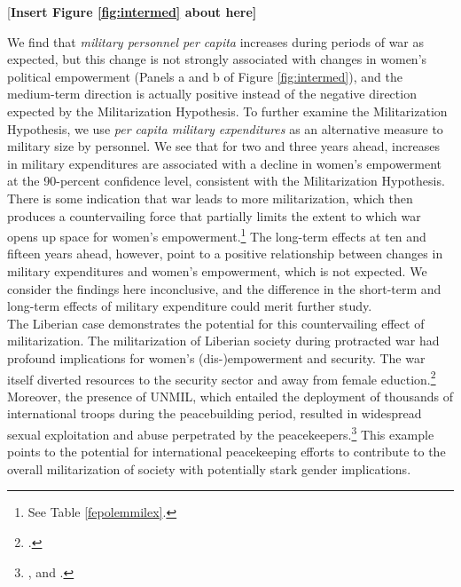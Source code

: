 \documentclass [12pt] {article}
\begin{document}
\begin{center}
[\bf Insert Figure \ref{fig:intermed} about here]
\end{center}
\vspace*{.2in}


We find that {\it military personnel per capita} increases during periods of war as expected, but this change is not strongly associated with changes in women's political empowerment (Panels a and b of Figure \ref{fig:intermed}), and the medium-term direction is actually positive instead of the negative direction expected by the Militarization Hypothesis. To further examine the Militarization Hypothesis, we use {\it per capita military expenditures} as an alternative measure to military size by personnel. We see that for two and three years ahead, increases in military expenditures are associated with a decline in women's empowerment at the 90-percent confidence level, consistent with the Militarization Hypothesis. There is some indication that war leads to more militarization, which then produces a countervailing force that partially limits the extent to which war opens up space for women's empowerment.\footnote{See %
Table \ref{fepolemmilex}.}  The long-term effects at ten and fifteen years ahead, however, point to a positive relationship between changes in military expenditures and women's empowerment, which is not expected. We consider the findings here inconclusive, and the difference in the short-term and long-term effects of military expenditure could merit further study.\\

The Liberian case demonstrates the potential for this countervailing effect of militarization. The militarization of Liberian society during protracted war had profound implications for women's (dis-)empowerment and security. The war itself diverted resources to the security sector and away from female eduction.\footnote{.}  Moreover, the presence of UNMIL, which entailed the deployment of thousands of international troops during the peacebuilding period, resulted in widespread sexual exploitation and abuse perpetrated by the peacekeepers.\footnote{,  and .} This example points to the potential for international peacekeeping efforts to contribute to the overall militarization of society with potentially stark gender implications.\\
\end{document}
